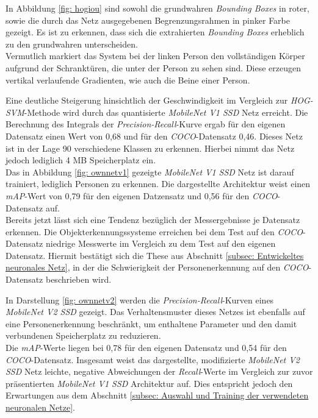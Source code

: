 In Abbildung \ref{fig: hogiou} sind sowohl die grundwahren \textit{Bounding Boxes} in roter, sowie die durch das Netz ausgegebenen Begrenzungsrahmen in pinker Farbe gezeigt. Es ist zu erkennen, dass sich die extrahierten \textit{Bounding Boxes} erheblich zu den grundwahren unterscheiden.\\

 Vermutlich markiert das System bei der linken Person den vollständigen Körper aufgrund der Schranktüren, die unter der Person zu sehen sind. Diese erzeugen vertikal verlaufende Gradienten, wie auch die Beine einer Person.


Eine deutliche Steigerung hinsichtlich der Geschwindigkeit im Vergleich zur \textit{HOG-SVM}-Methode wird durch das quantisierte \textit{MobileNet V1 SSD} Netz erreicht. Die Berechnung des Integrals der \textit{Precision-Recall}-Kurve ergab für den eigenen Datensatz einen Wert von 0,68 und für den \textit{COCO}-Datensatz 0,46. Dieses Netz ist in der Lage 90 verschiedene Klassen zu erkennen. Hierbei nimmt das Netz jedoch lediglich 4 MB Speicherplatz ein.\\



Das in Abbildung \ref{fig: ownnetv1} gezeigte \textit{MobileNet V1 SSD} Netz ist darauf trainiert, lediglich Personen zu erkennen. Die dargestellte Architektur weist einen \textit{mAP}-Wert von 0,79 für den eigenen Datzensatz und 0,56 für den \textit{COCO}-Datensatz auf. \\

Bereits jetzt lässt sich eine Tendenz bezüglich der Messergebnisse je Datensatz erkennen. Die Objekterkennungssysteme erreichen bei dem Test auf den \textit{COCO}-Datensatz niedrige Messwerte im Vergleich zu dem Test auf den eigenen Datensatz. Hiermit bestätigt sich die These aus Abschnitt \ref{subsec: Entwickeltes neuronales Netz}, in der die Schwierigkeit der Personenerkennung auf den \textit{COCO}-Datensatz beschrieben wird.



In Darstellung \ref{fig: ownnetv2} werden die \textit{Precision-Recall}-Kurven eines \textit{MobileNet V2 SSD} gezeigt. Das Verhaltensmuster dieses Netzes ist ebenfalls auf eine Personenerkennung beschränkt, um enthaltene Parameter und den damit verbundenen Speicherplatz zu reduzieren.\\

Die \textit{mAP}-Werte liegen bei 0,78 für den eigenen Datensatz und 0,54 für den \textit{COCO}-Datensatz. Insgesamt weist das dargestellte, modifizierte \textit{MobileNet V2 SSD} Netz leichte, negative Abweichungen der \textit{Recall}-Werte im Vergleich zur zuvor präsentierten \textit{MobileNet V1 SSD} Architektur auf. Dies entspricht jedoch den Erwartungen aus dem Abschnitt \ref{subsec: Auswahl und Training der verwendeten neuronalen Netze}.

